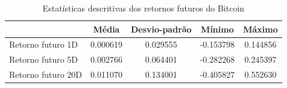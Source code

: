 \begin{table}
\caption{Estatísticas descritivas dos retornos futuros do Bitcoin}
\label{tab:estatisticas_retornos_futuros}
\begin{tabular}{lcccc}
\toprule
 & Média & Desvio-padrão & Mínimo & Máximo \\
\midrule
Retorno futuro 1D & 0.000619 & 0.029555 & -0.153798 & 0.144856 \\
Retorno futuro 5D & 0.002766 & 0.064401 & -0.282268 & 0.245397 \\
Retorno futuro 20D & 0.011070 & 0.134001 & -0.405827 & 0.552630 \\
\bottomrule
\end{tabular}
\end{table}
